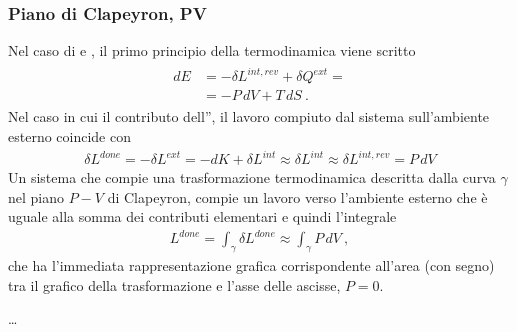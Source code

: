 \documentclass[letterpaper,10pt,italian]{jupyterBook}
\begin{document}
\subsubsection{Piano di Clapeyron, P\sphinxhyphen{}V}
\label{\detokenize{ch/thermodynamics/principles-phase-diagrams:piano-di-clapeyron-p-v}}
\sphinxAtStartPar
{}
Nel caso di  e , il primo principio della termodinamica viene scritto
\begin{equation*}
\begin{split}\begin{aligned}
  d E & = - \delta L^{int,rev} + \delta Q^{ext} = \\
      & = - P \, dV + T \, dS \ .
\end{aligned}\end{split}
\end{equation*}
\sphinxAtStartPar
Nel caso in cui il contributo dell”, il lavoro compiuto dal sistema sull’ambiente esterno coincide con
\begin{equation*}
\begin{split}\delta L^{done} = - \delta L^{ext} = - d K + \delta L^{int} \approx \delta L^{int} \approx \delta L^{int,rev} =  P \, dV\end{split}
\end{equation*}
\sphinxAtStartPar
Un sistema che compie una trasformazione termodinamica descritta dalla curva \(\gamma\) nel piano \(P-V\) di Clapeyron, compie un lavoro verso l’ambiente esterno che è uguale alla somma dei contributi elementari \sphinxhyphen{} e quindi l’integrale
\begin{equation*}
\begin{split}L^{done} = \int_{\gamma} \delta L^{done} \approx \int_{\gamma} P \, d V \ ,\end{split}
\end{equation*}
\sphinxAtStartPar
che ha l’immediata rappresentazione grafica corrispondente all’area (con segno) tra il grafico della trasformazione e l’asse delle ascisse, \(P=0\).

\sphinxAtStartPar
{}
…
\end{document}
